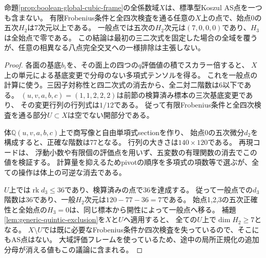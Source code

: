 \begin{theorem}[固定Boolean完全交叉上の全一基点係数域のAS排除]
\label{thm:boolean-one-point-uniform-exclusion}
命題\ref{prop:boolean-global-cubic-frame}の全係数域$X$は、標準型Koszul AS点を一つも含まない。
有限Frobenius条件と全四次検査を通る任意の$X$上の点で、始点0の五次$H_2$は7次元以上である。
一般点では五次の$H_2$次元は$(7,0,0,0)$であり、$H_3$は全始点で零である。
この結論は最初の三二次式を固定した場合の全域を覆うが、任意の相異なる八点完全交叉への一様排除は主張しない。
\end{theorem}
\begin{proof}
各面の基底$b_i$を、その面上の四つの$q$評価値の積でスカラー倍すると、
$X$上の単元による基底変更で分母のない多項式テンソルを得る。
これを一般点の計算に使う。三因子対称性と四二次式の消去から、全二対二階数は6以下である。
$(u,v,a,b,c)=(1,1,2,2,2)$は前節の検算済み標本の三次基底変更であり、
その変更行列の行列式は$1/12$である。
従って有限Frobenius条件と全四次検査を通る部分$U\subset X$は空でない開部分である。

体$\mathbb Q(u,v,a,b,c)$上で商写像と自由単項式sectionを作り、
始点0の五次微分$d_2$を構成すると、正確な階数は77となる。
行列の大きさは$140\times120$である。
再現コードは、
浮動小数や有限個の評価点を用いず、五変数の有理関数の消去でこの値を検証する。
計算量を抑えるためpivotの順序を多項式の項数等で選ぶが、全ての操作は体上の可逆な消去である。

$U$上では$\operatorname{rk}d_3\leq36$であり、検算済みの点で36を達成する。
従って一般点での$d_3$階数は36であり、一般$H_2$次元は$120-77-36=7$である。
始点1,2,3の五次正確性と全始点の$H_3=0$は、同じ標本から開性によって一般点へ移る。
補題\ref{lem:generic-quintic-exclusion}を$X$と$U$へ適用すると、
全ての$U$上で$\dim H_2\geq7$となる。
$X\setminus U$では既に必要なFrobenius条件か四次検査を失っているので、そこにもAS点はない。
大域評価フレームを使っているため、途中の局所正規化の追加分母が消える値もこの議論に含まれる。
\end{proof}
